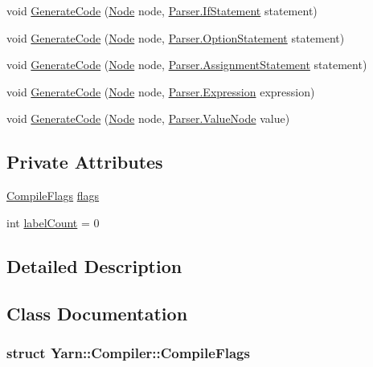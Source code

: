 \begin{DoxyCompactItemize}
void \hyperlink{a00032_a6ab14514a3b0644ae39c626e5e5e180d}{Generate\-Code} (\hyperlink{a00029_da/de0/a00317}{Node} node, \hyperlink{a00092}{Parser.\-If\-Statement} statement)
\item 
void \hyperlink{a00032_a5cb3cbcd9727bdef018ec5299bd13142}{Generate\-Code} (\hyperlink{a00029_da/de0/a00317}{Node} node, \hyperlink{a00118}{Parser.\-Option\-Statement} statement)
\item 
void \hyperlink{a00032_afb86d9228f66896abe31d47d72a267ce}{Generate\-Code} (\hyperlink{a00029_da/de0/a00317}{Node} node, \hyperlink{a00018}{Parser.\-Assignment\-Statement} statement)
\item 
void \hyperlink{a00032_a5c762915320958c3a03b193b06a7e279}{Generate\-Code} (\hyperlink{a00029_da/de0/a00317}{Node} node, \hyperlink{a00080}{Parser.\-Expression} expression)
\item 
void \hyperlink{a00032_a41438a0b25f2668a180372d05127d891}{Generate\-Code} (\hyperlink{a00029_da/de0/a00317}{Node} node, \hyperlink{a00162}{Parser.\-Value\-Node} value)
\end{DoxyCompactItemize}
\subsection*{Private Attributes}
\begin{DoxyCompactItemize}
\item 
\hyperlink{a00032_dd/db3/a00313}{Compile\-Flags} \hyperlink{a00032_a541022d89bcf9bc8f794eb6d6b438d08}{flags}
\item 
int \hyperlink{a00032_a87758397eba2e84cda8e0d6c40656f3f}{label\-Count} = 0
\end{DoxyCompactItemize}


\subsection{Detailed Description}


\subsection{Class Documentation}
\label{dd/db3/a00313}
\hypertarget{a00032_dd/db3/a00313}{}
\subsubsection{struct Yarn\-:\-:Compiler\-:\-:Compile\-Flags}


